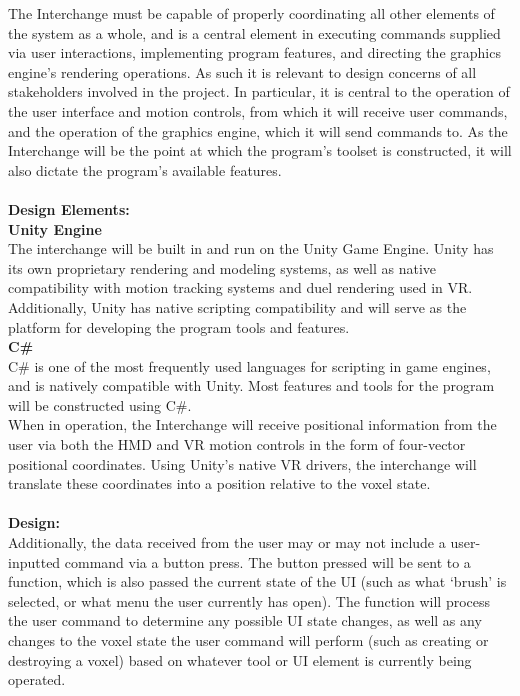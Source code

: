 \documentclass[onecolumn, draftclsnofoot,10pt, compsoc]{IEEEtran}
\begin{document}
The Interchange must be capable of properly coordinating all other elements of the system as a whole, and is a central element  in executing commands supplied via user interactions, implementing program features, and directing the graphics engine’s rendering operations. As such it is relevant to design concerns of all stakeholders involved in the project. In particular, it is central to the operation of the user interface and motion controls, from which it will receive user commands, and the operation of the graphics engine, which it will send commands to. As the Interchange will be the point at which the program’s toolset is constructed, it will also dictate the program’s available features.\\ \\
\textbf{Design Elements:}\\ 
\textbf{Unity Engine} \\
The interchange will be built in and run on the Unity Game Engine. Unity has its own proprietary rendering and modeling systems, as well as native compatibility with motion tracking systems and duel rendering used in VR. Additionally, Unity has native scripting compatibility and will serve as the platform for developing the program tools and features. \\  
\textbf{C\#} \\
C\# is one of the most frequently used languages for scripting in game engines, and is natively compatible with Unity. Most features and tools for the program will be constructed using C\#. \\
When in operation, the Interchange will receive positional information from the user via both the HMD and VR motion controls in the form of four-vector positional coordinates. Using Unity’s native VR drivers, the interchange will translate these coordinates into a position relative to the voxel state. \\ \\ 
\textbf{Design:} \\
Additionally, the data received from the user may or may not include a user-inputted command via a button press. The button pressed will be sent to a function, which is also passed the current state of the UI (such as what ‘brush’ is selected, or what menu the user currently has open). The function will process the user command to determine any possible UI state changes, as well as any changes to the voxel state the user command will perform (such as creating or destroying a voxel) based on whatever tool or UI element is currently being operated. 
\end{document}
